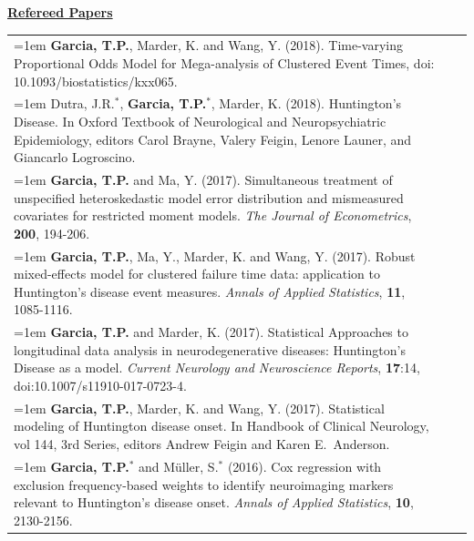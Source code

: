 \documentclass[12pt]{article}
\makeatletter
\newcounter{myCounter}
\newcounter{myCounterThree}
\newcommand*{\myCounterThreeLast}{%
  \zref@extractdefault{LastPage}{myCounterThree}{0}%
}
\renewcommand*{\themyCounterThree}{%
  \@arabic{\numexpr\myCounterThreeLast+1-\value{myCounterThree}\relax}%
}
\newcommand{\removespace}{\vspace{-2.5ex}}
\def\bam{\begin{addmargin}[1em]{1.25em}}
\def\eam{\end{addmargin}}
\def\ben{\newline\bam\removespace}
\def\een{\removespace\eam}
\def\myhang{\hangindent=1em
\hangafter=1}
\makeatother
\begin{document}
\vskip 0.2in
\underline{{\bf Refereed Papers}}
\vskip 0.1in


\begin{longtable}{@{\stepcounter{myCounterThree}
\themyCounterThree.\hspace*{\tabcolsep}}p{15cm} p{0cm} l}



%
\myhang
{\bf Garcia, T.P.}, Marder, K. and Wang, Y. (2018). Time-varying Proportional Odds Model for Mega-analysis of Clustered Event Times,  doi: 10.1093/biostatistics/kxx065.\\

\myhang
Dutra, J.R.$^*$,  {\bf Garcia, T.P.}$^*$, Marder, K. (2018). Huntington's Disease. In Oxford Textbook of Neurological and Neuropsychiatric Epidemiology, editors Carol Brayne, Valery Feigin, Lenore Launer, and Giancarlo Logroscino.\\

\myhang
{\bf Garcia, T.P.} and Ma, Y. (2017).   Simultaneous treatment of unspecified heteroskedastic model error distribution and mismeasured covariates for restricted moment models. \emph{The Journal of Econometrics}, {\bf 200}, 194-206. \\

\myhang
{\bf Garcia, T.P.}, Ma, Y., Marder, K. and Wang, Y. (2017). Robust mixed-effects model for clustered failure time data: application to Huntington's disease event measures. \emph{Annals  of Applied Statistics}, {\bf 11}, 1085-1116.\\


\myhang
{\bf Garcia, T.P.} and Marder, K. (2017). Statistical Approaches to longitudinal data analysis in neurodegenerative diseases: Huntington's Disease as a model. \emph{Current Neurology and Neuroscience Reports}, {\bf 17}:14, doi:10.1007/s11910-017-0723-4.\\




\myhang
{\bf Garcia, T.P.}, Marder, K. and Wang, Y. (2017). Statistical modeling of Huntington disease onset.
In Handbook of Clinical Neurology, vol 144, 3rd Series, editors Andrew Feigin and Karen E.~Anderson. \\

%
\myhang
{\bf Garcia, T.P.}$^*$ and M\"uller, S.$^*$ (2016). Cox regression with exclusion frequency-based weights to identify neuroimaging markers relevant to Huntington's disease onset. \emph{Annals of Applied Statistics}, {\bf 10}, 2130-2156.
\\


\end{longtable}
\end{document}
